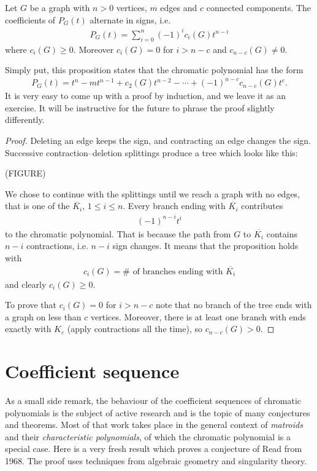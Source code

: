 \begin{proposition}
Let $G$ be a graph with $n>0$ vertices, $m$ edges and $c$ connected components. The coefficients of $P_G(t)$ alternate in signs, i.e.
\begin{align*}
P_G(t)=\sum_{i=0}^n (-1)^i c_i(G)t^{n-i}
\end{align*}
where $c_i(G)\ge 0$. Moreover $c_i(G)=0$ for $i>n-c$ and $c_{n-c}(G)\neq 0$.
\end{proposition}
Simply put, this proposition states that the chromatic polynomial has the form
\begin{align*}
P_G(t)=t^n-mt^{n-1}+c_2(G)t^{n-2}-\cdots + (-1)^{n-c}c_{n-c}(G)t^c.
\end{align*}
It is very easy to come up with a proof by induction, and we leave it as an exercise. It will be instructive for the future to phrase the proof slightly differently.
\begin{proof} Deleting an edge keeps the sign, and contracting an edge changes the sign. Successive contraction--deletion splittings produce a tree which looks like this:

(FIGURE)

We chose to continue with the splittings until we reach a graph with no edges, that is one of the $\overline{K_i}$, $1\le i \le n$. Every branch ending with $\overline{K_i}$ contributes
\begin{align*}
(-1)^{n-i}t^i
\end{align*}
to the chromatic polynomial. That is because the path from $G$ to $\overline{K_i}$ contains $n-i$ contractions, i.e. $n-i$ sign changes. It means that the proposition holds with
\begin{align*}
c_i(G)=\# \text{ of branches ending with } \overline{K_i}
\end{align*}
and clearly $c_i(G)\geq 0$.

To prove that $c_i(G)=0$ for $i>n-c$ note that no branch of the tree ends with a graph on less than $c$ vertices. Moreover, there is at least one branch with ends exactly with $K_c$ (apply contractions all the time), so $c_{n-c}(G)>0$.
\end{proof}


\section{Coefficient sequence}

As a small side remark, the behaviour of the coefficient sequences of chromatic polynomials is the subject of active research and is the topic of many conjectures and theorems. Most of that work takes place in the general context of \emph{matroids} and their \emph{characteristic polynomials}, of which the chromatic polynomial is a special case. Here is a very fresh result which proves a conjecture of Read from 1968. The proof uses techniques from algebraic geometry and singularity theory.

